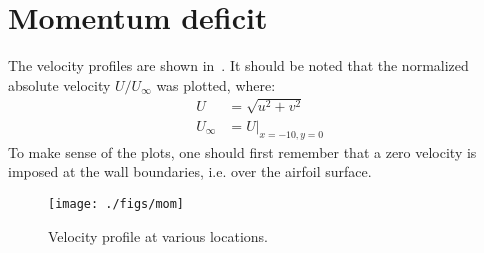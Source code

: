 \section{Momentum deficit}
The velocity profiles are shown in~. It should be noted that the normalized
absolute velocity $U/U_\infty$ was plotted, where:
\begin{align*}
    U &= \sqrt{u^2 + v^2}\\
    U_\infty &= U\big|_{x=-10, y=0}
\end{align*}
To make sense of the plots, one should first remember that a zero velocity is imposed at the
wall boundaries, i.e. over the airfoil surface.
\newpage
\begin{landscape}
    \begin{figure}
        \centering
        \texttt{[image: ./figs/mom]}
        \caption{Velocity profile at various locations.}\label{fig:mom}
    \end{figure}
\end{landscape}

